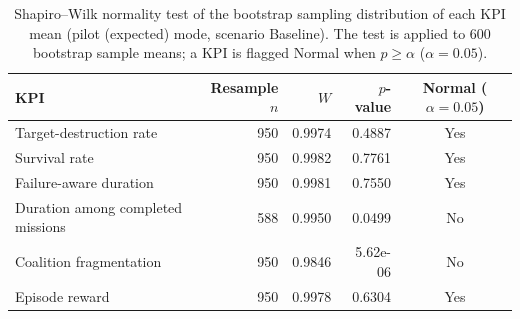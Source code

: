 \begin{table}[htbp]
  \centering
  \caption{Shapiro--Wilk normality test of the bootstrap sampling distribution of each KPI mean (pilot (expected) mode, scenario Baseline). The test is applied to 600 bootstrap sample means; a KPI is flagged Normal when $p \geq \alpha$ ($\alpha=0.05$).}
  \label{tab:normality_Baseline_pilot}
  \begin{tabular}{lrrrc}
    \toprule
    KPI & Resample $n$ & $W$ & $p$-value & Normal ($\alpha=0.05$) \\
    \midrule
    Target-destruction rate & 950 & 0.9974 & 0.4887 & Yes \\
    Survival rate & 950 & 0.9982 & 0.7761 & Yes \\
    Failure-aware duration & 950 & 0.9981 & 0.7550 & Yes \\
    Duration among completed missions & 588 & 0.9950 & 0.0499 & No \\
    Coalition fragmentation & 950 & 0.9846 & 5.62e-06 & No \\
    Episode reward & 950 & 0.9978 & 0.6304 & Yes \\
    \bottomrule
  \end{tabular}
\end{table}
